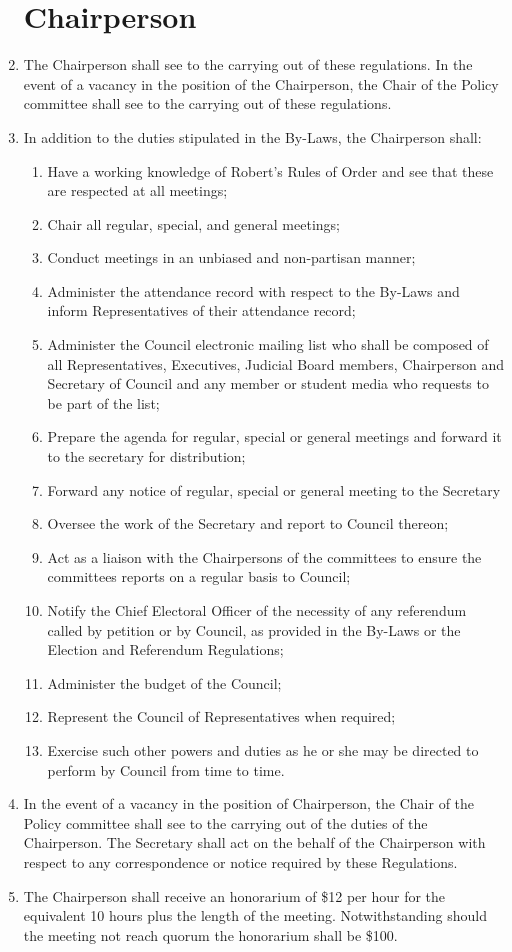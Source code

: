\documentclass[oneside]{book}
\begin{document}
\begin{enumerate}
\section{\label{Chairperson}Chairperson }
\item The Chairperson shall see to the carrying out of these regulations.
In the event of a vacancy in the position of the Chairperson, the
Chair of the Policy committee shall see to the carrying out of these
regulations. 
\item In addition to the duties stipulated in the By-Laws, the Chairperson
shall: 

\begin{enumerate}
\item Have a working knowledge of Robert's Rules of Order and see that these
are respected at all meetings; 
\item Chair all regular, special, and general meetings; 
\item Conduct meetings in an unbiased and non-partisan manner; 
\item Administer the attendance record with respect to the By-Laws and inform
Representatives of their attendance record; 
\item Administer the Council electronic mailing list who shall be composed
of all Representatives, Executives, Judicial Board members, Chairperson
and Secretary of Council and any member or student media who requests
to be part of the list; 
\item Prepare the agenda for regular, special or general meetings and forward
it to the secretary for distribution; 
\item Forward any notice of regular, special or general meeting to the Secretary 
\item Oversee the work of the Secretary and report to Council thereon; 
\item Act as a liaison with the Chairpersons of the committees to ensure
the committees reports on a regular basis to Council; 
\item Notify the Chief Electoral Officer of the necessity of any referendum
called by petition or by Council, as provided in the By-Laws or the
Election and Referendum Regulations; 
\item Administer the budget of the Council; 
\item Represent the Council of Representatives when required; 
\item Exercise such other powers and duties as he or she may be directed
to perform by Council from time to time. 
\end{enumerate}
\item In the event of a vacancy in the position of Chairperson, the Chair
of the Policy committee shall see to the carrying out of the duties
of the Chairperson. The Secretary shall act on the behalf of the Chairperson
with respect to any correspondence or notice required by these Regulations. 
\item The Chairperson shall receive an honorarium of \$12 per hour for the
equivalent 10 hours plus the length of the meeting. Notwithstanding
should the meeting not reach quorum the honorarium shall be \$100. 


\end{enumerate}
\end{document}
